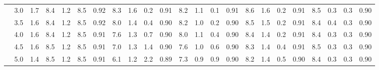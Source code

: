 \begin{table}
{\begin{tabular}{lc|cc|ccc|cccc|cccc|cccc|cccc}
 & 3.0 & 1.7 & 8.4 & 1.2 & 8.5 & 0.92 & 8.3 & 1.6 & 0.2 & 0.91 & 8.2 & 1.1 & 0.1 & 0.91 & 8.6 & 1.6 & 0.2 & 0.91 & 8.5 & 0.3 & 0.3 & 0.90 \\
 & 3.5 & 1.6 & 8.4 & 1.2 & 8.5 & 0.92 & 8.0 & 1.4 & 0.4 & 0.90 & 8.2 & 1.0 & 0.2 & 0.90 & 8.5 & 1.5 & 0.2 & 0.91 & 8.4 & 0.4 & 0.3 & 0.90 \\
 & 4.0 & 1.6 & 8.4 & 1.2 & 8.5 & 0.91 & 7.6 & 1.3 & 0.7 & 0.90 & 8.0 & 1.1 & 0.4 & 0.90 & 8.4 & 1.4 & 0.2 & 0.91 & 8.4 & 0.3 & 0.3 & 0.90 \\
 & 4.5 & 1.6 & 8.5 & 1.2 & 8.5 & 0.91 & 7.0 & 1.3 & 1.4 & 0.90 & 7.6 & 1.0 & 0.6 & 0.90 & 8.3 & 1.4 & 0.4 & 0.91 & 8.5 & 0.3 & 0.3 & 0.90 \\
 & 5.0 & 1.4 & 8.5 & 1.2 & 8.5 & 0.91 & 6.1 & 1.2 & 2.2 & 0.89 & 7.3 & 0.9 & 0.9 & 0.90 & 8.2 & 1.4 & 0.5 & 0.90 & 8.4 & 0.3 & 0.3 & 0.90 \\
\bottomrule
\end{tabular}}
\end{table}
